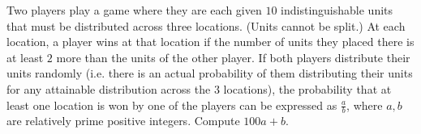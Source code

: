 Two players play a game where they are each given $10$ indistinguishable units that must be distributed across three locations. (Units cannot be split.) At each location, a player wins at that location if the number of units they placed there is at least $2$ more than the units of the other player. If both players distribute their units randomly (i.e. there is an actual probability of them distributing their units for any attainable distribution across the $3$ locations), the probability that at least one location is won by one of the players can be expressed as $\frac{a}{b}$, where $a, b$ are relatively prime positive integers. Compute $100a + b$.
